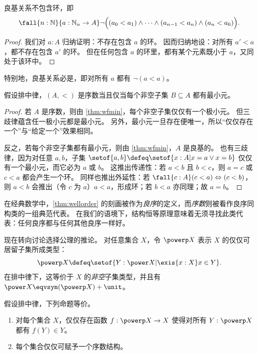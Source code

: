 \begin{lem}
  良基关系不包含环，即
  \[ \fall{n:\mathbb{N}}{a:\mathbb{N}_n\to A} \neg\Big((a_0<a_1) \wedge \dots \wedge (a_{n-1}<a_n)\wedge (a_n<a_0)\Big). \]
\end{lem}
\begin{proof}
  我们对 $a:A$ 归纳证明：不存在包含 $a$ 的环。
  因而归纳地设：对所有 $a'<a$，都不存在包含 $a'$ 的环。
  但在任何包含 $a$ 的环里，都有某个元素既小于 $a$，又同处于该环中。
\end{proof}

%
%
特别地，良基关系必是，即对所有 $a$ 都有 $\neg(a<a)$。

\begin{thm}\label{thm:wellorder}
  假设排中律，$(A,<)$ 是序数当且仅当每个非空子集 $B\subseteq A$ 都有最小元。
\end{thm}
\begin{proof}
  若 $A$ 是序数，则由 \cref{thm:wfmin}，每个非空子集仅仅有一个极小元。
  但三歧律蕴含任一极小元都是最小元。
  另外，最小元一旦存在便唯一，所以“仅仅存在一个”与“给定一个”效果相同。

  反之，若每个非空子集都有最小元，则由 \cref{thm:wfmin}，$A$ 是良基的。
  也有三歧律，因为对任意 $a,b$，子集
  $ \setof{a,b} \defeq \setof{x:A | x=a \lor x=b} $
  仅仅有一个最小元，而它必为 $a$ 或 $b$。
  这推出传递性：若 $a<b$ 且 $b<c$，则 $a=c$ 或 $c<a$ 都会产生一个环。
  同样也推出外延性：若 $\fall{c:A}(c<a)\Leftrightarrow (c<b)$，则 $a<b$ 会推出（令 $c$ 为 $a$）$a<a$，形成环；若 $b<a$ 亦同理；故 $a=b$。
\end{proof}

在经典数学中，\cref{thm:wellorder} 的刻画被作为\emph{良序}的定义，而\emph{序数}则被看作良序同构类的一组典范代表。
在我们的语境下，结构恒等原理意味着无须寻找此类代表：任何良序都与任何其他良序一样好。

现在转向讨论选择公理的推论。
对任意集合 $X$，令 $\powerp X$ 表示 $X$ 的仅仅可居留子集所成类型：
\[ \powerp X \defeq \setof{ Y : \power X | \exis{x:X} x\in Y}. \]
在排中律下，这等价于 $X$ 的\emph{非空}子集类型，并且有 $\power X \eqvsym (\powerp X) + \unit$。

\begin{thm}\label{thm:wop}
  假设排中律，下列命题等价。
  \begin{enumerate}
  \item 对每个集合 $X$，仅仅存在函数
    $ f: \powerp X \to X $
    使得对所有 $Y:\powerp X$ 都有 $f(Y)\in Y$。\label{item:wop1}
  \item 每个集合仅仅可赋予一个序数结构。\label{item:wop2}
  \end{enumerate}
\end{thm}

